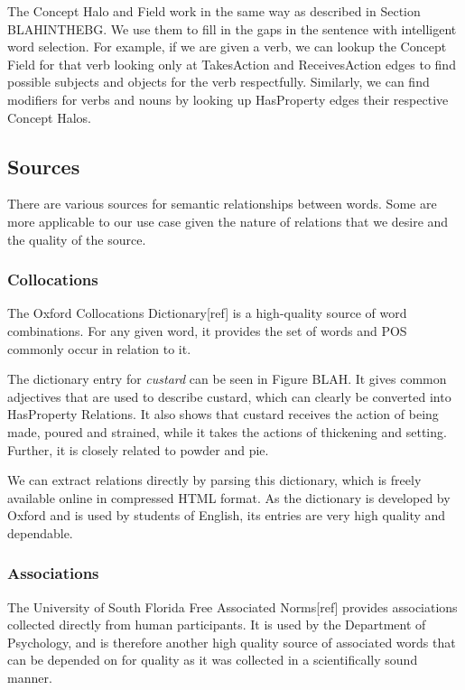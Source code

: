 The Concept Halo and Field work in the same way as described in Section BLAHINTHEBG. We use them to fill in the gaps in the sentence with intelligent word selection. For example, if we are given a verb, we can lookup the Concept Field for that verb looking only at TakesAction and ReceivesAction edges to find possible subjects and objects for the verb respectfully. Similarly, we can find modifiers for verbs and nouns by looking up HasProperty edges their respective Concept Halos.

\subsection{Sources}
There are various sources for semantic relationships between words. Some are more applicable to our use case given the nature of relations that we desire and the quality of the source.

\subsubsection{Collocations}
The Oxford Collocations Dictionary[ref] is a high-quality source of word combinations. For any given word, it provides the set of words and POS commonly occur in relation to it.

The dictionary entry for \textit{custard} can be seen in Figure BLAH. It gives common adjectives that are used to describe custard, which can clearly be converted into HasProperty Relations. It also shows that custard receives the action of being made, poured and strained, while it takes the actions of thickening and setting. Further, it is closely related to powder and pie.

We can extract relations directly by parsing this dictionary, which is freely available online in compressed HTML format. As the dictionary is developed by Oxford and is used by students of English, its entries are very high quality and dependable.

\subsubsection{Associations}
The University of South Florida Free Associated Norms[ref] provides associations collected directly from human participants. It is used by the Department of Psychology, and is therefore another high quality source of associated words that can be depended on for quality as it was collected in a scientifically sound manner.

